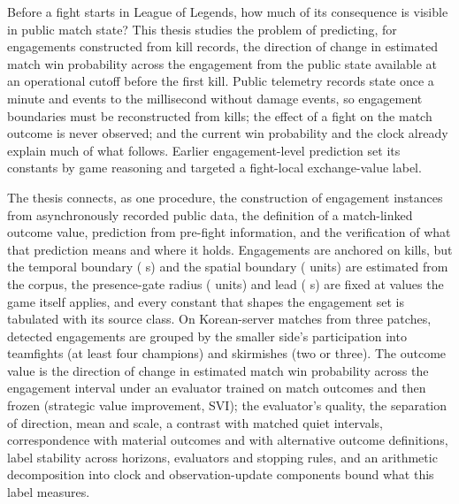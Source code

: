\begin{abstracten}
Before a fight starts in League of Legends, how much of its consequence is visible in public match state? This thesis studies the problem of predicting, for engagements constructed from kill records, the direction of change in estimated match win probability across the engagement from the public state available at an operational cutoff before the first kill. Public telemetry records state once a minute and events to the millisecond without damage events, so engagement boundaries must be reconstructed from kills; the effect of a fight on the match outcome is never observed; and the current win probability and the clock already explain much of what follows. Earlier engagement-level prediction set its constants by game reasoning and targeted a fight-local exchange-value label.

The thesis connects, as one procedure, the construction of engagement instances from asynchronously recorded public data, the definition of a match-linked outcome value, prediction from pre-fight information, and the verification of what that prediction means and where it holds. Engagements are anchored on kills, but the temporal boundary (\constG{} s) and the spatial boundary (\constD{} units) are estimated from the corpus, the presence-gate radius (\constR{} units) and lead (\constB{} s) are fixed at values the game itself applies, and every constant that shapes the engagement set is tabulated with its source class. On \numMatchesTotal{} Korean-server matches from three patches, detected engagements are grouped by the smaller side's participation into teamfights (at least four champions) and skirmishes (two or three). The outcome value is the direction of change in estimated match win probability across the engagement interval under an evaluator trained on match outcomes and then frozen (strategic value improvement, SVI); the evaluator's quality, the separation of direction, mean and scale, a contrast with matched quiet intervals, correspondence with material outcomes and with alternative outcome definitions, label stability across horizons, evaluators and stopping rules, and an arithmetic decomposition into clock and observation-update components bound what this label measures.


\end{abstracten}

